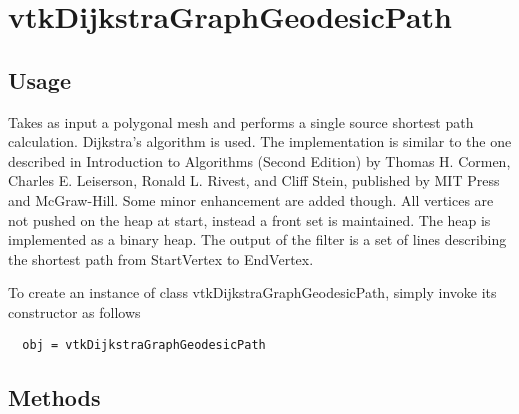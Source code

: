 \section{vtkDijkstraGraphGeodesicPath}

\subsection{Usage}

 Takes as input a polygonal mesh and performs a single source shortest 
 path calculation. Dijkstra's algorithm is used. The implementation is 
 similar to the one described in Introduction to Algorithms (Second Edition)
 by Thomas H. Cormen, Charles E. Leiserson, Ronald L. Rivest, and 
 Cliff Stein, published by MIT Press and McGraw-Hill. Some minor 
 enhancement are added though. All vertices are not pushed on the heap
 at start, instead a front set is maintained. The heap is implemented as 
 a binary heap. The output of the filter is a set of lines describing 
 the shortest path from StartVertex to EndVertex.


To create an instance of class vtkDijkstraGraphGeodesicPath, simply
invoke its constructor as follows
\begin{verbatim}
  obj = vtkDijkstraGraphGeodesicPath
\end{verbatim}
\subsection{Methods}

